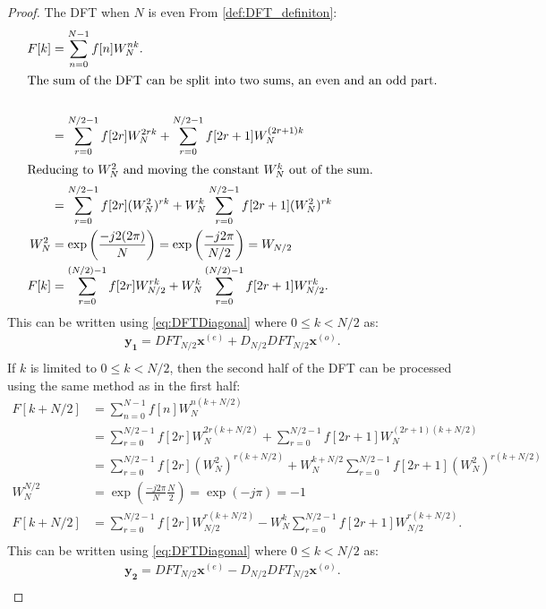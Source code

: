 \begin{proof}{The DFT when $N$ is even}
From \autoref{def:DFT_definiton}:
    \begin{align*}
         F[k]&=\sum^{N-1}_{n=0}f[n]W_N^{nk}.\\
        \intertext{The sum of the DFT can be split into two sums, an even and an odd part.}\\
        &=\sum^{N/2-1}_{r=0}f[2r]W_N^{2rk}+\sum^{N/2-1}_{r=0}f[2r+1]W_N^{(2r+1)k}\\
        \intertext{Reducing to $W_N^2$ and moving the constant $W_N^k$ out of the sum.}
        &=\sum^{N/2-1}_{r=0}f[2r](W_N^2)^{rk}+W_N^k\sum^{N/2-1}_{r=0}f[2r+1](W_N^2)^{rk}\\
        W_N^2 &= \exp\left(\frac{-j2(2\pi)}{N}\right) = \exp\left(\frac{-j2\pi}{N/2}\right) = W_{N/2}\\        %
        F[k] &= \sum^{(N/2)-1}_{r=0}f[2r]W^{rk}_{N/2}+W^k_N\sum^{(N/2)-1}_{r=0}f[2r+1]W^{rk}_{N/2}.\\
    \end{align*}
     This can be written using \eqref{eq:DFTDiagonal} where $0 \leq k < N/2$ as:
     \begin{align*}
        \mathbf{y_1}=DFT_{N/2}\mathbf{x}^{(e)}+D_{N/2}DFT_{N/2}\mathbf{x}^{(o)}.\\ 
     \end{align*}
    If $k$ is limited to $0 \leq k < N/2$, then the second half of the DFT can be processed using the same method as in the first half:
    \begin{align*}
        F[k+N/2] &= \sum^{N-1}_{n=0}f[n]W_N^{n(k+N/2)}\\
        &=\sum^{N/2-1}_{r=0}f[2r]W_N^{2r(k+N/2)}+\sum^{N/2-1}_{r=0}f[2r+1]W_N^{(2r+1)(k+N/2)}\\
        &=\sum^{N/2-1}_{r=0}f[2r](W_N^2)^{r(k+N/2)}+W_N^{k+N/2}\sum^{N/2-1}_{r=0}f[2r+1](W_N^2)^{r(k+N/2)}\\
        W_N^{N/2}&=\exp\left(\frac{-j2\pi}{N}\frac{N}{2}\right)=\exp\left(-j\pi\right)=-1\\
        F[k+N/2] &=\sum^{N/2-1}_{r=0}f[2r]W_{N/2}^{r(k+N/2)}-W_N^{k}\sum^{N/2-1}_{r=0}f[2r+1]W_{N/2}^{r(k+N/2)}.\\
    \end{align*}
    This can be written using \eqref{eq:DFTDiagonal} where $0 \leq k < N/2$ as:
    \begin{align*}
        \mathbf{y_2}=DFT_{N/2}\mathbf{x}^{(e)}-D_{N/2}DFT_{N/2}\mathbf{x}^{(o)}.\\ 
     \end{align*}
     \cite[67]{ryan2019linear}
\end{proof}
